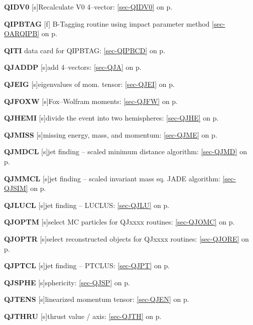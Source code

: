  \item{\bf QIDV0   }[s]Recalculate V0 4--vector: \ref{sec-QIDV0} on p.~\pageref{sec-QIDV0}
 
 \item{\bf QIPBTAG }[f] B-Tagging routine using impact parameter method
 \ref{sec-OARQIPB} on p.~\pageref{sec-OARQIPB}\\
 \item{\bf QITI    }data card for QIPBTAG: \ref{sec-QIPBCD} on p.~\pageref{sec-QIPBCD}\\
 \item{\bf QJADDP  }[s]add 4--vectors: \ref{sec-QJA} on p.~\pageref{sec-QJA}\\
 \item{\bf QJEIG   }[s]eigenvalues of mom. tensor: \ref{sec-QJEI} on p.~\pageref{sec-QJEI}\\
 \item{\bf QJFOXW  }[s]Fox--Wolfram moments: \ref{sec-QJFW} on p.~\pageref{sec-QJFW}\\
 \item{\bf QJHEMI  }[s]divide the event into two hemispheres:
 \ref{sec-QJHE} on p.~\pageref{sec-QJHE}\\
 \item{\bf QJMISS  }[s]missing energy, mass, and momentum:
 \ref{sec-QJME} on p.~\pageref{sec-QJME}\\
 \item{\bf QJMDCL  }[s]jet finding -- scaled minimum distance algorithm:
 \ref{sec-QJMD} on p.~\pageref{sec-QJMD}\\
 \item{\bf QJMMCL  }[s]jet finding -- scaled invariant mass sq. JADE algorithm:
 \ref{sec-QJSIM} on p.~\pageref{sec-QJSIM}\\
 \item{\bf QJLUCL }[s]jet finding -- LUCLUS: \ref{sec-QJLU} on p.~\pageref{sec-QJLU}\\
 \item{\bf QJOPTM }[s]select MC particles for QJxxxx routines: \ref{sec-QJOMC}
 on p.~\pageref{sec-QJOMC}\\
 \item{\bf QJOPTR }[s]select reconstructed objects for QJxxxx routines: \ref{sec-QJORE}
 on p.~\pageref{sec-QJORE}\\
 \item{\bf QJPTCL }[s]jet finding -- PTCLUS: \ref{sec-QJPT}
 on p.~\pageref{sec-QJPT}\\
 \item{\bf QJSPHE }[s]sphericity: \ref{sec-QJSP} on p.~\pageref{sec-QJSP}\\
 \item{\bf QJTENS  }[s]linearized momentum tensor: \ref{sec-QJEN} on
 p.~\pageref{sec-QJEN}\\
 \item{\bf QJTHRU  }[s]thrust value / axis: \ref{sec-QJTH}
 on p.~\pageref{sec-QJTH}
 
